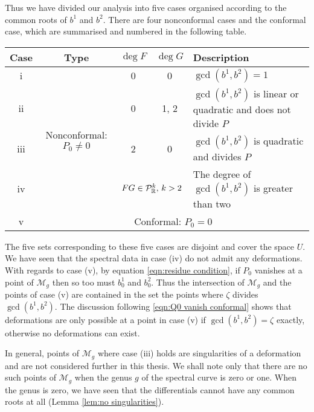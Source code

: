 Thus we have divided our analysis into five cases organised according to the common roots of $b^1$ and $b^2$. There are four nonconformal cases and the conformal case, which are summarised and numbered in the following table.
\begin{center}
\begin{tabular}{|c|c|c|c|l|}
\hline
Case & Type & $\deg F$ & $\deg G$ & Description\\ \hline\hline
i & \multirow{4}{*}{Nonconformal: $P_0 \neq 0$} & 0 & 0
& $\gcd(b^1,b^2) = 1$\\ \cline{1-1}\cline{3-5}
ii && 0 & 1, 2
& $\gcd(b^1,b^2)$ is linear or quadratic and does not divide $P$ \\ \cline{1-1}\cline{3-5}
iii && 2 & 0
& $\gcd(b^1,b^2)$ is quadratic and divides $P$ \\ \cline{1-1}\cline{3-5}
iv && \multicolumn{2}{|c|}{$FG \in \mathcal{P}^k_\R,\, k>2$}
& The degree of $\gcd(b^1,b^2)$ is greater than two \\ \hline\hline
v & \multicolumn{4}{|c|}{Conformal: $P_0 = 0$} \\ \hline
\end{tabular}
\end{center}

The five sets corresponding to these five cases are disjoint and cover the space $U$. We have seen that the spectral data in case (iv) do not admit any deformations.
With regards to case (v), by equation \eqref{eqn:residue condition}, if $P_0$ vanishes at a point of $\mathcal{M}_g$ then so too must $b^1_0$ and $b^2_0$. Thus the intersection of $\mathcal{M}_g$ and the points of case (v) are contained in the set the points where $ζ$ divides $\gcd(b^1,b^2)$. The discussion following \eqref{eqn:Q0 vanish conformal} shows that deformations are only possible at a point in case (v) if $\gcd(b^1,b^2) = ζ$ exactly, otherwise no deformations can exist.

In general, points of $\mathcal{M}_g$ where case (iii) holds are singularities of a deformation \cite{Schmidt2016} and are not considered further in this thesis. We shall note only that there are no such points of $\mathcal{M}_g$ when the genus $g$ of the spectral curve is zero or one.
When the genus is zero, we have seen that the differentials cannot have any common roots at all (Lemma \ref{lem:no singularities}).

